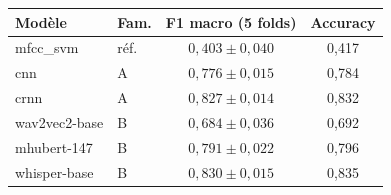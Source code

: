 \begin{tabular}{@{}llcc@{}}
\toprule
Modèle & Fam. & F1 macro (5 folds) & Accuracy \\
\midrule
mfcc\_svm & réf. & $0{,}403 \pm 0{,}040$ & 0{,}417 \\
cnn & A & $0{,}776 \pm 0{,}015$ & 0{,}784 \\
crnn & A & $0{,}827 \pm 0{,}014$ & 0{,}832 \\
wav2vec2-base & B & $0{,}684 \pm 0{,}036$ & 0{,}692 \\
mhubert-147 & B & $0{,}791 \pm 0{,}022$ & 0{,}796 \\
whisper-base & B & $0{,}830 \pm 0{,}015$ & 0{,}835 \\
\bottomrule
\end{tabular}

